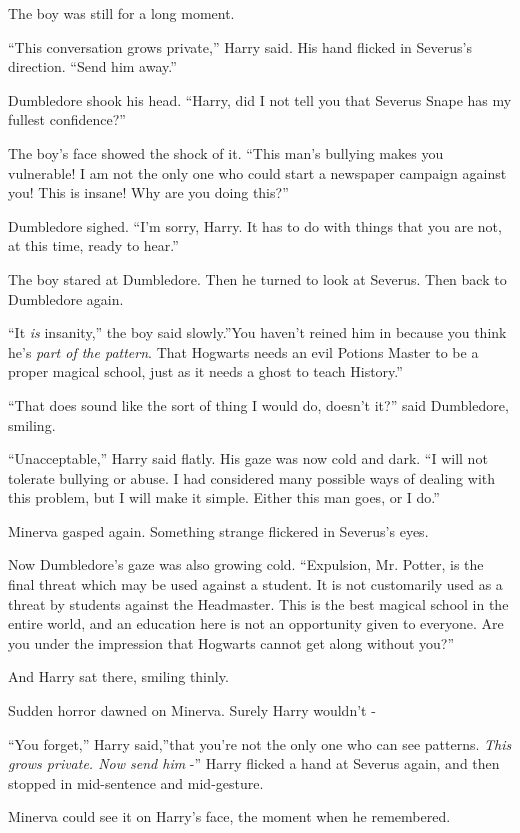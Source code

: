 The boy was still for a long moment.

``This conversation grows private,'' Harry said. His hand flicked in
Severus's direction. ``Send him away.''

Dumbledore shook his head. ``Harry, did I not tell you that Severus
Snape has my fullest confidence?''

The boy's face showed the shock of it. ``This man's bullying makes you
vulnerable! I am not the only one who could start a newspaper campaign
against you! This is insane! Why are you doing this?''

Dumbledore sighed. ``I'm sorry, Harry. It has to do with things that you
are not, at this time, ready to hear.''

The boy stared at Dumbledore. Then he turned to look at Severus. Then
back to Dumbledore again.

``It \emph{is} insanity,'' the boy said slowly.''You haven't reined him
in because you think he's \emph{part of the pattern}. That Hogwarts
needs an evil Potions Master to be a proper magical school, just as it
needs a ghost to teach History.''

``That does sound like the sort of thing I would do, doesn't it?'' said
Dumbledore, smiling.

``Unacceptable,'' Harry said flatly. His gaze was now cold and dark. ``I
will not tolerate bullying or abuse. I had considered many possible ways
of dealing with this problem, but I will make it simple. Either this man
goes, or I do.''

Minerva gasped again. Something strange flickered in Severus's eyes.

Now Dumbledore's gaze was also growing cold. ``Expulsion, Mr. Potter, is
the final threat which may be used against a student. It is not
customarily used as a threat by students against the Headmaster. This is
the best magical school in the entire world, and an education here is
not an opportunity given to everyone. Are you under the impression that
Hogwarts cannot get along without you?''

And Harry sat there, smiling thinly.

Sudden horror dawned on Minerva. Surely Harry wouldn't -

``You forget,'' Harry said,''that you're not the only one who can see
patterns. \emph{This grows private. Now send him} -'' Harry flicked a
hand at Severus again, and then stopped in mid-sentence and mid-gesture.

Minerva could see it on Harry's face, the moment when he remembered.

